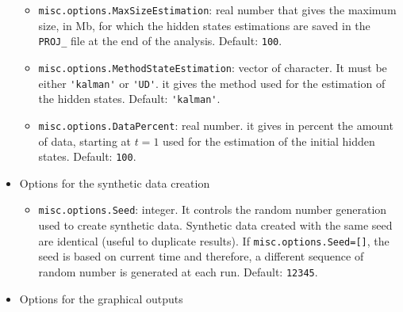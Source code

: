 \begin{itemize}
\begin{itemize}
\item \lstinline[basicstyle = \mlttfamily \small ]!misc.options.MaxSizeEstimation!: real number that gives the maximum size, in Mb, for which the hidden states estimations are saved in the \lstinline[basicstyle = \mlttfamily \small ]!PROJ_! file at the end of the analysis. Default: \lstinline[basicstyle = \mlttfamily \small ]!100!.
\item \lstinline[basicstyle = \mlttfamily \small ]!misc.options.MethodStateEstimation!: vector of character. It must be either \lstinline[basicstyle = \mlttfamily \small ]!'kalman'! or \lstinline[basicstyle = \mlttfamily \small ]!'UD'!. it gives the method used for the estimation of the hidden states. Default: \lstinline[basicstyle = \mlttfamily \small ]!'kalman'!.
\item \lstinline[basicstyle = \mlttfamily \small ]!misc.options.DataPercent!: real number. it gives in percent the amount of data, starting at $t=1$ used for the estimation of the initial hidden states. Default: \lstinline[basicstyle = \mlttfamily \small ]!100!.
\end{itemize}


\item Options for the synthetic data creation

\begin{itemize}
\item \lstinline[basicstyle = \mlttfamily \small ]!misc.options.Seed!: integer. It controls the random number generation used to create synthetic data. Synthetic data created with the same seed are identical (useful to duplicate results). If  \lstinline[basicstyle = \mlttfamily \small ]!misc.options.Seed=[]!, the seed is based on current time and therefore, a different sequence of random number  is generated at each run. Default: \lstinline[basicstyle = \mlttfamily \small ]!12345!.
\end{itemize}

\item Options for the graphical outputs


\end{itemize}
